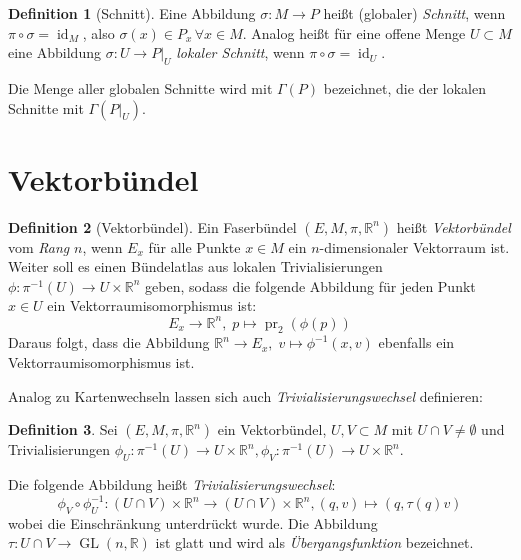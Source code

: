 \documentclass[a4paper]{scrreprt}
\numberwithin{equation}{chapter}
\DeclareMathOperator{\id}{id}
\DeclareMathOperator{\GL}{GL}
\DeclareMathOperator{\pr}{pr}
\newcommand{\R}{\mathbb{R}}
\theoremstyle{definition}
\newtheorem{defn}{Definition}[section]
\begin{document}
		\begin{defn}[Schnitt]
			Eine Abbildung $\sigma\colon M\rightarrow P$ heißt (globaler) \emph{Schnitt}, wenn $\pi\circ\sigma=\id_M$, also $\sigma(x)\in P_x\, \forall x\in M$. Analog heißt für eine offene Menge $U\subset M$ eine Abbildung $\sigma\colon U\rightarrow P\vert_U$ \emph{lokaler Schnitt}, wenn $\pi\circ\sigma=\id_U$.

			Die Menge aller globalen Schnitte wird mit $\Gamma(P)$ bezeichnet, die der lokalen Schnitte mit $\Gamma(P\vert_U)$.
		\end{defn}
	\section{Vektorbündel}
		\begin{defn}[Vektorbündel]
				Ein Faserbündel $(E,M,\pi,\R^n)$ heißt \emph{Vektorbündel} vom \emph{Rang} $n$, wenn $E_x$ für alle Punkte $x\in M$ ein $n$-dimensionaler Vektorraum ist. Weiter soll es einen Bündelatlas aus lokalen Trivialisierungen ${\phi\colon \pi^{-1}(U)\rightarrow U\times \R^n}$ geben, sodass die folgende Abbildung für jeden Punkt $x\in U$ ein Vektorraumisomorphismus ist:
				\begin{equation*}
					E_x\rightarrow \R^n,\; p\mapsto \pr_2(\phi(p))
				\end{equation*}
			Daraus folgt, dass die Abbildung ${\R^n\rightarrow E_x,\; v\mapsto \phi^{-1}(x,v)}$ ebenfalls ein Vektorraumisomorphismus ist.
		\end{defn}
		Analog zu Kartenwechseln lassen sich auch \emph{Trivialisierungswechsel} definieren:
		\begin{defn}
			Sei $(E,M,\pi,\R^n)$ ein Vektorbündel, $U,V\subset M$ mit $U\cap V\neq\emptyset$ und Trivialisierungen ${\phi_U\colon \pi^{-1}(U)\rightarrow U\times \R^n}, {\phi_V\colon \pi^{-1}(U)\rightarrow U\times \R^n}$.

			Die folgende Abbildung heißt \emph{Trivialisierungswechsel}:
			\begin{equation*}
				\phi_V\circ\phi_U^{-1}\colon (U\cap V)\times \R^n\rightarrow (U\cap V)\times \R^n, (q,v)\mapsto (q,\tau(q)v)
			\end{equation*}
			wobei die Einschränkung unterdrückt wurde. Die Abbildung $\tau\colon U\cap V\rightarrow \GL(n,\R)$ ist glatt und wird als \emph{Übergangsfunktion} bezeichnet.
		\end{defn}
\end{document}
